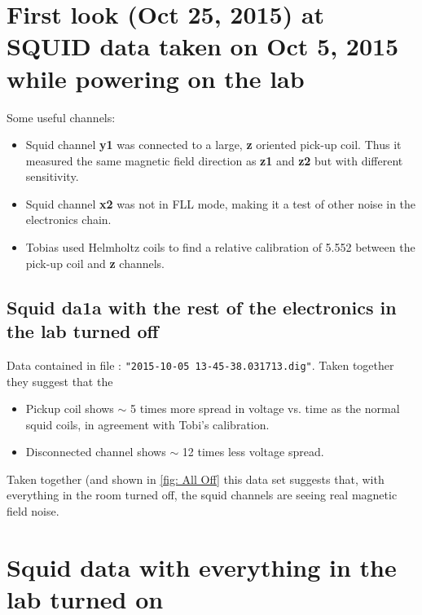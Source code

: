 \documentclass[11pt]{article}
\begin{document}
\tableofcontents
\newpage
\section{First look (Oct 25, 2015) at SQUID data taken on Oct 5, 2015 while powering on the lab}
Some useful channels:
\begin{itemize}
\item Squid channel {\bf y1} was connected to a large, {\bf z} oriented pick-up coil.  Thus it measured the same magnetic field direction as {\bf z1} and {\bf z2} but with different sensitivity.
\item Squid channel {\bf x2} was not in FLL mode, making it a test of other noise in the electronics chain.
\item Tobias used Helmholtz coils to find a relative calibration of 5.552  between the pick-up coil and \textbf{z} channels. 
\end{itemize}
\subsection{Squid da1a with the rest of the electronics in the lab turned off}

Data contained in file : \texttt{"2015-10-05 13-45-38.031713.dig"}.  Taken together they suggest that the 
\begin{itemize}
\item Pickup coil shows $\sim$ 5 times more spread in voltage vs. time as the normal squid coils, in agreement with Tobi's calibration.
\item Disconnected channel shows $\sim$ 12 times less voltage spread.
\end{itemize}

Taken together (and shown in \ref{fig: All Off} this data set suggests that, with everything in the room turned off, the squid channels are seeing real magnetic field noise.


\section{Squid data with everything in the lab turned on}
\end{document}
